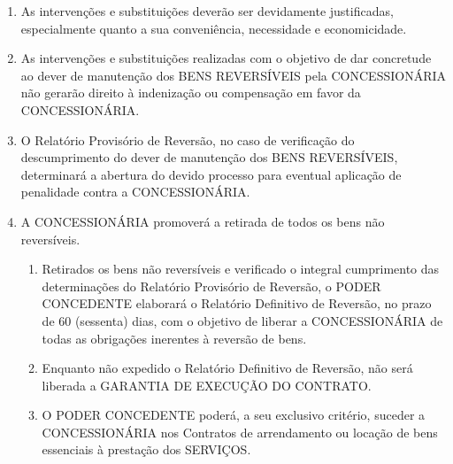 \documentclass[a4paper,11pt]{report} %
\begin{document}
\begin{enumerate}
\item \label{itm:NLYW} As intervenções e substituições deverão ser devidamente justificadas, especialmente quanto a sua conveniência, necessidade e economicidade.

\item \label{itm:7VLK} As intervenções e substituições realizadas com o objetivo de dar concretude ao dever de manutenção dos BENS REVERSÍVEIS pela CONCESSIONÁRIA não gerarão direito à indenização ou compensação em favor da CONCESSIONÁRIA.

\item \label{itm:4H69} O Relatório Provisório de Reversão, no caso de verificação do descumprimento do dever de manutenção dos BENS REVERSÍVEIS, determinará a abertura do devido processo para eventual aplicação de penalidade contra a CONCESSIONÁRIA.

\item \label{itm:5U6A} A CONCESSIONÁRIA promoverá a retirada de todos os bens não reversíveis.

\begin{enumerate}[label*=\arabic*.]
\item \label{itm:E7BZ} Retirados os bens não reversíveis e verificado o integral cumprimento das determinações do Relatório Provisório de Reversão, o PODER CONCEDENTE elaborará o Relatório Definitivo de Reversão, no prazo de 60 (sessenta) dias, com o objetivo de liberar a CONCESSIONÁRIA de todas as obrigações inerentes à reversão de bens.

\item \label{itm:6XYG} Enquanto não expedido o Relatório Definitivo de Reversão, não será liberada a GARANTIA DE EXECUÇÃO DO CONTRATO.

\item \label{itm:52YD} O PODER CONCEDENTE poderá, a seu exclusivo critério, suceder a CONCESSIONÁRIA nos Contratos de arrendamento ou locação de bens essenciais à prestação dos SERVIÇOS.
\end{enumerate}
\end{enumerate}
\end{document}
